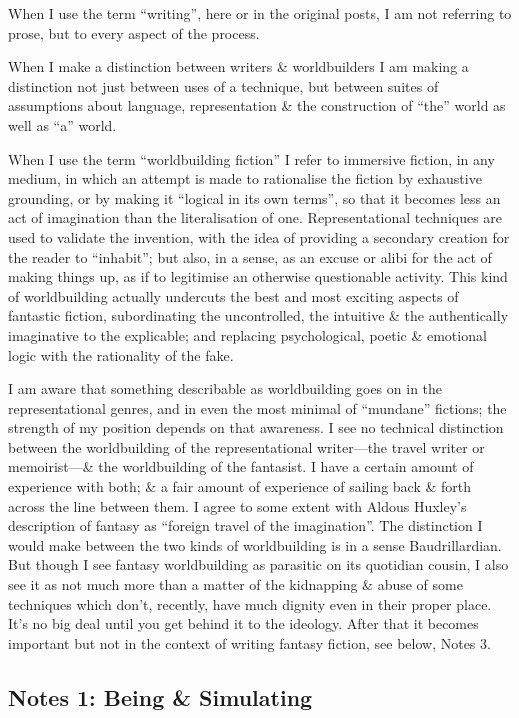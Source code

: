 \documentclass[14pt]{extarticle}
\begin{document}
When I use the term “writing”, here or in the original posts, I am not referring to prose, but to every aspect of the process.

When I make a distinction between writers \& worldbuilders I am making a distinction not just between uses of a technique, but between suites of assumptions about language, representation \& the construction of “the” world as well as “a” world.

When I use the term “worldbuilding fiction” I refer to immersive fiction, in any medium, in which an attempt is made to rationalise the fiction by exhaustive grounding, or by making it “logical in its own terms”, so that it becomes less an act of imagination than the literalisation of one. Representational techniques are used to validate the invention, with the idea of providing a secondary creation for the reader to “inhabit”; but also, in a sense, as an excuse or alibi for the act of making things up, as if to legitimise an otherwise questionable activity. This kind of worldbuilding actually undercuts the best and most exciting aspects of fantastic fiction, subordinating the uncontrolled, the intuitive \& the authentically imaginative to the explicable; and replacing psychological, poetic \& emotional logic with the rationality of the fake.

I am aware that something describable as worldbuilding goes on in the representational genres, and in even the most minimal of “mundane” fictions; the strength of my position depends on that awareness. I see no technical distinction between the worldbuilding of the representational writer—the travel writer or memoirist—\& the worldbuilding of the fantasist. I have a certain amount of experience with both; \& a fair amount of experience of sailing back \& forth across the line between them. I agree to some extent with Aldous Huxley’s description of fantasy as “foreign travel of the imagination”. The distinction I would make between the two kinds of worldbuilding is in a sense Baudrillardian. But though I see fantasy worldbuilding as parasitic on its quotidian cousin, I also see it as not much more than a matter of the kidnapping \& abuse of some techniques which don’t, recently, have much dignity even in their proper place. It’s no big deal until you get behind it to the ideology. After that it becomes important but not in the context of writing fantasy fiction, see below, Notes 3.

\subsection*{Notes 1: Being \& Simulating}
\end{document}
